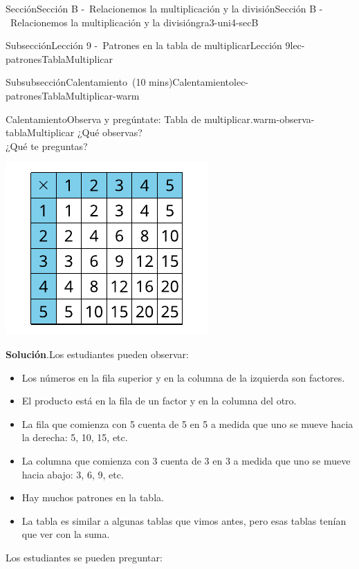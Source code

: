 \documentclass[oneside,10pt,]{article}
\newcommand{\blocktitlefont}{\relax}
\begin{document}
\begin{sectionptx}{Sección}{Sección B -~Relacionemos la multiplicación y la división}{}{Sección B -~Relacionemos la multiplicación y la división}{}{}{gra3-uni4-secB}
\begin{subsectionptx}{Subsección}{Lección 9 -~Patrones en la tabla de multiplicar}{}{Lección 9}{}{}{lec-patronesTablaMultiplicar}
\begin{subsubsectionptx}{Subsubsección}{Calentamiento~(10 mins)}{}{Calentamiento}{}{}{lec-patronesTablaMultiplicar-warm}
\begin{exploration}{Calentamiento}{Observa y pregúntate: Tabla de multiplicar.}{warm-observa-tablaMultiplicar}%
¿Qué observas?\\
 ¿Qué te preguntas?%
\begin{image}{0}{1}{0}{}%
\includegraphics[width=\linewidth]{external/svg-source/tikz-file-152968-scale13.pdf}
\end{image}%
\par\smallskip%
\noindent\textbf{\blocktitlefont Solución}.\hypertarget{warm-observa-tablaMultiplicar-3}{}\quad{}Los estudiantes pueden observar:%
%
\begin{itemize}[label=\textbullet]
\item{}Los números en la fila superior y en la columna de la izquierda son factores.%
\item{}El producto está en la fila de un factor y en la columna del otro.%
\item{}La fila que comienza con 5 cuenta de 5 en 5 a medida que uno se mueve hacia la derecha: 5, 10, 15, etc.%
\item{}La columna que comienza con 3 cuenta de 3 en 3 a medida que uno se mueve hacia abajo: 3, 6, 9, etc.%
\item{}Hay muchos patrones en la tabla.%
\item{}La tabla es similar a algunas tablas que vimos antes, pero esas tablas tenían que ver con la suma.%
\end{itemize}
Los estudiantes se pueden preguntar:%

\end{exploration}
\end{subsubsectionptx}
\end{subsectionptx}
\end{sectionptx}
\end{document}
